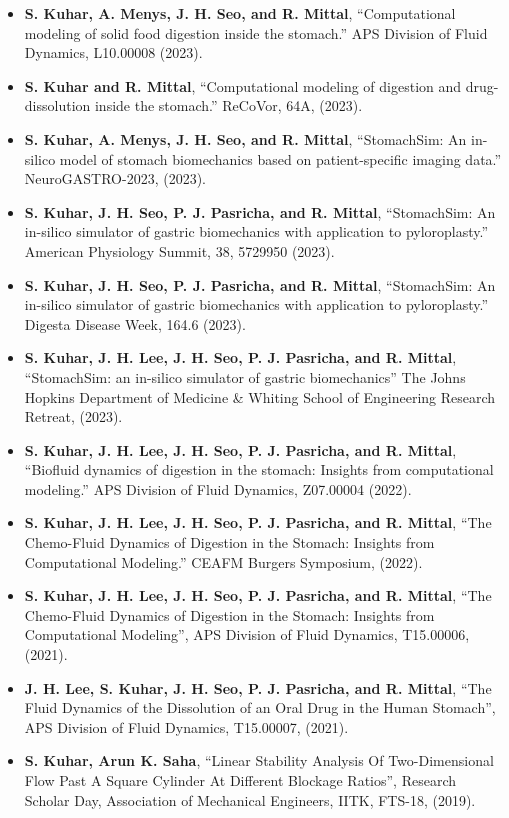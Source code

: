 \documentclass[11pt]{article}
\begin{document}
\begin{itemize}[leftmargin=*,itemsep=1pt]
    \item \textbf{S. Kuhar, A. Menys, J. H. Seo, and R. Mittal}, “Computational modeling of solid food digestion inside the stomach.” APS Division of Fluid Dynamics, L10.00008 (2023).
    \item \textbf{S. Kuhar and R. Mittal}, “Computational modeling of digestion and drug-dissolution inside the stomach.” ReCoVor, 64A, (2023).
    \item \textbf{S. Kuhar, A. Menys, J. H. Seo, and R. Mittal}, “StomachSim: An in-silico model of stomach biomechanics based on patient-specific imaging data.” NeuroGASTRO-2023, (2023).
    \item \textbf{S. Kuhar, J. H. Seo, P. J. Pasricha, and R. Mittal}, “StomachSim: An in-silico simulator of gastric biomechanics with application to pyloroplasty.” American Physiology Summit, 38, 5729950 (2023).
    \item \textbf{S. Kuhar, J. H. Seo, P. J. Pasricha, and R. Mittal}, “StomachSim: An in-silico simulator of gastric biomechanics with application to pyloroplasty.” Digesta Disease Week, 164.6 (2023).
    \item \textbf{S. Kuhar, J. H. Lee, J. H. Seo, P. J. Pasricha, and R. Mittal}, “StomachSim: an in-silico simulator of gastric biomechanics” The Johns Hopkins Department of Medicine \& Whiting School of Engineering Research Retreat, (2023).
    \item \textbf{S. Kuhar, J. H. Lee, J. H. Seo, P. J. Pasricha, and R. Mittal}, “Biofluid dynamics of digestion in the stomach: Insights from computational modeling.” APS Division of Fluid Dynamics, Z07.00004 (2022).
    \item \textbf{S. Kuhar, J. H. Lee, J. H. Seo, P. J. Pasricha, and R. Mittal}, “The Chemo-Fluid Dynamics of Digestion in the Stomach: Insights from Computational Modeling.” CEAFM Burgers Symposium, (2022).
    \item \textbf{S. Kuhar, J. H. Lee, J. H. Seo, P. J. Pasricha, and R. Mittal}, “The Chemo-Fluid Dynamics of Digestion in the Stomach: Insights from Computational Modeling”, APS Division of Fluid Dynamics, T15.00006, (2021).
    \item \textbf{J. H. Lee, S. Kuhar, J. H. Seo, P. J. Pasricha, and R. Mittal}, “The Fluid Dynamics of the Dissolution of an Oral Drug in the Human Stomach”, APS Division of Fluid Dynamics, T15.00007, (2021).
    \item \textbf{S. Kuhar, Arun K. Saha}, “Linear Stability Analysis Of Two-Dimensional Flow Past A Square Cylinder At Different Blockage Ratios”, Research Scholar Day, Association of Mechanical Engineers, IITK, FTS-18, (2019).
\end{itemize}
\end{document}
